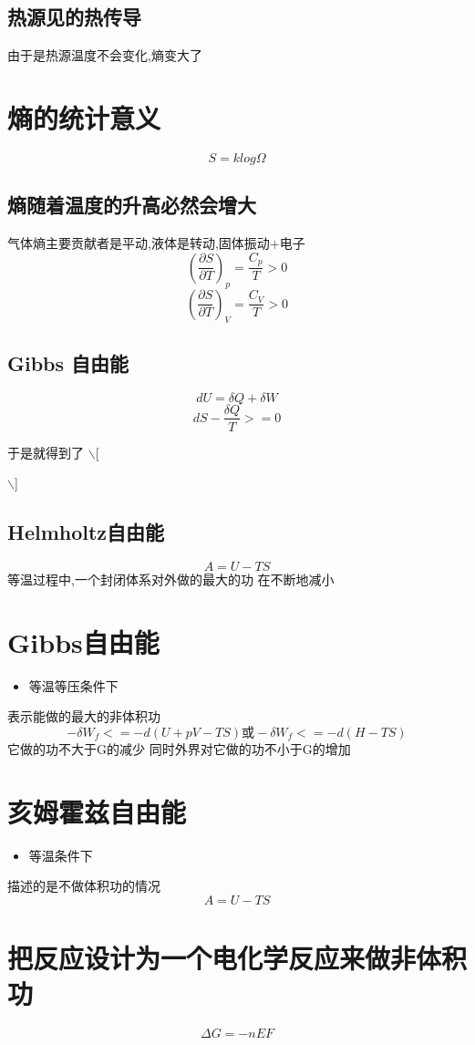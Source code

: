 \documentclass[11pt]{article}
\begin{document}
\subsection{热源见的热传导}
\label{sec:org58b9881}
由于是热源温度不会变化,熵变大了
\section{熵的统计意义}
\label{sec:orgc7e8fae}
\[
S=k log\Omega
\]
\subsection{熵随着温度的升高必然会增大}
\label{sec:org8285629}
气体熵主要贡献者是平动,液体是转动,固体振动+电子
\[
(\frac{\partial S}{\partial T})_p =\frac{C_p}{T} >0
\]
\[
(\frac{\partial S}{\partial T})_V =\frac{C_V}{T} >0
\]
\subsection{Gibbs 自由能}
\label{sec:org2872213}
\[
dU=\delta Q+\delta W 
\]
\[
dS-\frac{\delta Q}{T} >=0
\]

于是就得到了
$\backslash$[

$\backslash$]
\subsection{Helmholtz自由能}
\label{sec:org4347327}
\[
A=U-TS
\]
等温过程中,一个封闭体系对外做的最大的功
在不断地减小
\section{Gibbs自由能}
\label{sec:org97c0344}
\begin{itemize}
\item 等温等压条件下
\end{itemize}
表示能做的最大的非体积功
\[
-\delta W_f <= -d(U+pV-TS) \mbox{或} -\delta W_f <= -d(H-TS)
\]
它做的功不大于G的减少 同时外界对它做的功不小于G的增加

\section{亥姆霍兹自由能}
\label{sec:orgffb4694}
\begin{itemize}
\item 等温条件下
\end{itemize}
描述的是不做体积功的情况
\[
A=U-TS
\]
\section{把反应设计为一个电化学反应来做非体积功}
\label{sec:org2105433}
\[
\Delta G=-nEF
\]
\end{document}
